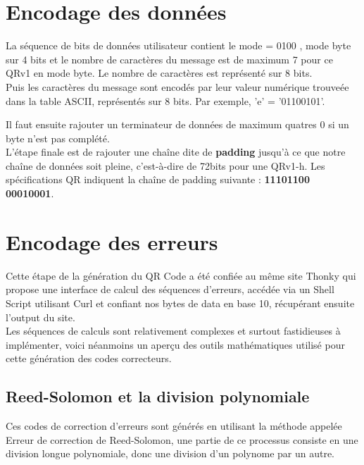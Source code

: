 \documentclass{report}
\begin{document}
	\section{Encodage des données}

		La séquence de bits de données utilisateur contient le mode = 0100 , mode byte sur 4 bits et le nombre de caractères du message est de maximum 7 pour ce QRv1 en mode byte. Le nombre de caractères est représenté sur 8 bits.\\

        Puis les caractères du message sont encodés par leur valeur numérique trouveée dans la table ASCII, représentés sur 8 bits. Par exemple, 'e' = '01100101'.

		Il faut ensuite rajouter un terminateur de données de maximum quatres 0 si un byte n'est pas complété.\\

		L'étape finale est de rajouter une chaîne dite de \textbf{padding} jusqu'à ce que notre chaîne de données soit pleine, c'est-à-dire de 72bits pour une QRv1-h. Les spécifications QR indiquent la chaîne de padding suivante : \textbf{11101100 00010001}.\\

	\section{Encodage des erreurs}

		Cette étape de la génération du QR Code a été confiée au même site Thonky qui propose une interface de calcul des séquences d'erreurs, accédée via un Shell Script utilisant Curl et confiant nos bytes de data en base 10, récupérant ensuite l'output du site.\\

		Les séquences de calculs sont relativement complexes et surtout fastidieuses à implémenter, voici néanmoins un aperçu des outils mathématiques utilisé pour cette génération des codes correcteurs.\\

		\subsection{Reed-Solomon et la division polynomiale}

			Ces codes de correction d'erreurs sont générés en utilisant la méthode appelée Erreur de correction de Reed-Solomon, une partie de ce processus consiste en une division longue polynomiale, donc une division d'un polynome par un autre.\\
\end{document}
